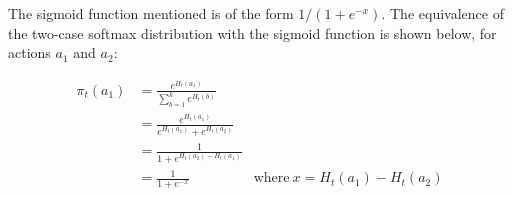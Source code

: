The sigmoid function mentioned is of the form $1/(1+e^{-x})$. The equivalence of the two-case softmax distribution with the sigmoid function is shown below, for actions $a_1$ and $a_2$:

\vspace{-6mm}
\begingroup
\addtolength{\jot}{0.5em}
\begin{align*}
\pi_t(a_1) &= \frac{e^{H_t(a_1)}}{\sum_{b=1}^{k}e^{H_t(b)}} \\
&= \frac{e^{H_t(a_1)}}{e^{H_t(a_1)} + e^{H_t(a_2)}} \\
&= \frac{1}{1 + e^{H_t(a_2) - H_t(a_1)}} \\
&= \frac{1}{1 + e^{-x}} & \text{where} \ x = H_t(a_1) - H_t(a_2)
\end{align*}
\endgroup